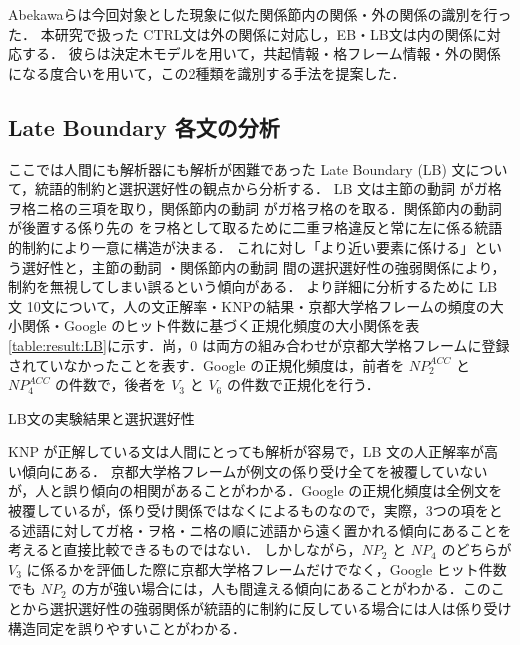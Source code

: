 \documentclass[japanese]{jnlp_1.4}
\def\modified#1{}
\begin{document}
Abekawaらは今回対象とした現象に似た関係節内の関係・外の関係の識別を行った\cite{Abekawa05}．
本研究で扱った CTRL文は外の関係に対応し，EB・LB文は内の関係に対応する．
彼らは決定木モデルを用いて，共起情報・格フレーム情報・外の関係になる度合いを用いて，この2種類を識別する手法を提案した．


\subsection{Late Boundary 各文の分析}


ここでは人間にも解析器にも解析が困難であった Late Boundary (LB) 文について，統語的制約と選択選好性の観点から分析する．
LB 文は主節の動詞 \modified{$V_{6}$} がガ格ヲ格ニ格の三項を取り，関係節内の動詞 \modified{$V_{3}$} がガ格ヲ格の\modified{二項}を取る．関係節内の動詞 \modified{$V_{3}$} が後置する係り先の \modified{$NP_{4}$} をヲ格として取るために二重ヲ格違反と常に左に係る統語的制約により一意に構造が決まる．
これに対し「より近い要素に係ける」という選好性と，主節の動詞 \modified{$V_{6}$}・関係節内の動詞 \modified{$V_{3}$}間の選択選好性の強弱関係により，制約を無視してしまい誤るという傾向がある．
より詳細に分析するために LB 文 10文について，人の文正解率・KNPの結果・京都大学格フレームの頻度の大小関係・Google のヒット件数に基づく正規化頻度の大小関係を表\ref{table:result:LB}に示す．\modified{京都大学格フレームの頻度について，$NP_{2}$vs$NP_{4}$ は $NP_{2}^{ACC}V_{3}$ と$NP_{4}^{ACC}V_{3}$で，$V_{3}$vs$V_{6}$ は $NP_{2}^{ACC}V_{3}$ と$NP_{2}^{ACC}V_{6}$ で，それぞれどちらの頻度が高いかを表す．}尚，0 は両方の組み合わせが京都大学格フレームに登録されていなかったことを表す．Google の正規化頻度は，前者を $NP_{2}^{ACC}$ と $NP_{4}^{ACC}$ の件数で，後者を $V_{3}$ と $V_{6}$ の件数で正規化を行う．\modified{例文は人の文正解率の良い順に並べられ，下線は選択選好性が例文を正しく解析するために良い影響を与えるものを表す．}

\begin{table}[b]
\caption{LB文の実験結果と選択選好性} 
\label{table:result:LB} 

\end{table}


KNP が正解している文は人間にとっても解析が容易で，LB 文の人正解率が高い傾向にある．
京都大学格フレームが例文の係り受け全てを被覆していないが，人と誤り傾向の相関があることがわかる．Google の正規化頻度は全例文を被覆しているが，係り受け関係ではなく\modified{連続文字列}によるものなので，\modified{人間の誤り傾向と Google のヒット件数による選択選好性の間に矛盾があるところがいくつかある．}実際，3つの項をとる述語に対してガ格・ヲ格・ニ格の順に述語から遠く置かれる傾向にあることを考えると直接比較できるものではない．
しかしながら，$NP_{2}$ と $NP_{4}$ のどちらが $V_{3}$ に係るかを評価した際に京都大学格フレームだけでなく，Google ヒット件数でも $NP_{2}$ の方が強い場合には，人も間違える傾向にあることがわかる．このことから選択選好性の強弱関係が統語的に制約に反している場合には人は係り受け構造同定を誤りやすいことがわかる．
\end{document}
